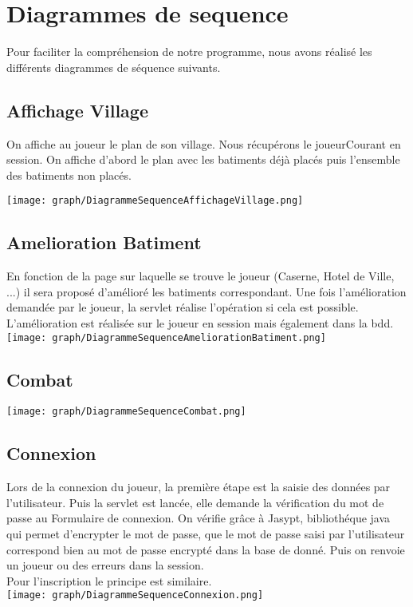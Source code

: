 \chapter{Diagrammes de sequence}
    Pour faciliter la compréhension de notre programme, nous avons réalisé les différents diagrammes de séquence suivants. 

    \section{Affichage Village}

    On affiche au joueur le plan de son village. Nous récupérons le joueurCourant en session. On affiche d'abord le plan avec les batiments déjà placés puis l'ensemble des batiments non placés. 
    
        \texttt{[image: graph/DiagrammeSequenceAffichageVillage.png]}
        
    
    \section{Amelioration Batiment}

    En fonction de la page sur laquelle se trouve le joueur (Caserne, Hotel de Ville, ...) il sera proposé d'amélioré les batiments correspondant. Une fois l'amélioration demandée par le joueur, la servlet réalise l'opération si cela est possible. L'amélioration est réalisée sur le joueur en session mais également dans la bdd.
        \texttt{[image: graph/DiagrammeSequenceAmeliorationBatiment.png]}
        
    
    \section{Combat}

        \texttt{[image: graph/DiagrammeSequenceCombat.png]}    
    
    \section{Connexion}

    Lors de la connexion du joueur, la première étape est la saisie des données par l'utilisateur. Puis la servlet est lancée, elle demande la vérification du mot de passe au Formulaire de connexion. On vérifie grâce à Jasypt, bibliothéque java qui permet d'encrypter le mot de passe, que le mot de passe saisi par l'utilisateur correspond bien au mot de passe encrypté dans la base de donné. Puis on renvoie un joueur ou des erreurs dans la session. \\
    Pour l'inscription le principe est similaire. \\
        \texttt{[image: graph/DiagrammeSequenceConnexion.png]}  
        
